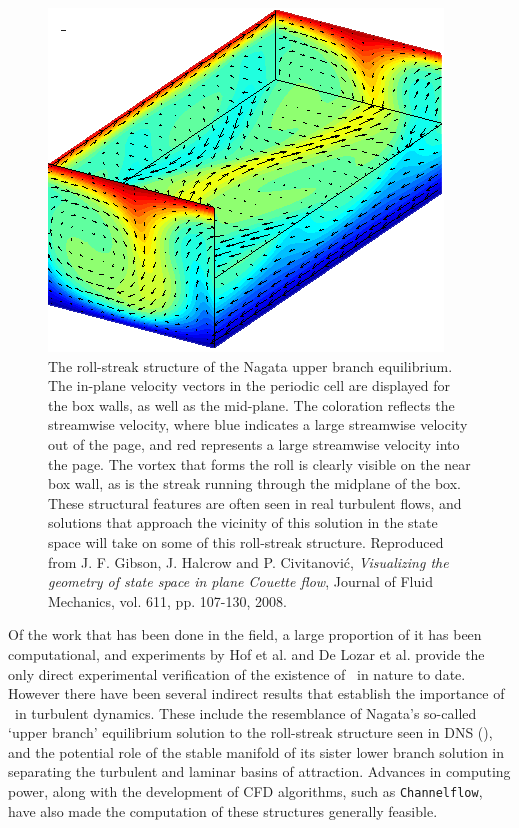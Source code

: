 \begin{figure}[t]
\centerline{\includegraphics[scale=0.5]{Figs/rollStreak}}
\caption[The roll-streak structure of the Nagata upper branch equilibrium]{The roll-streak structure of the Nagata upper branch equilibrium. The in-plane velocity vectors in the periodic cell are displayed for the box walls, as well as the mid-plane. The coloration reflects the streamwise velocity, where blue indicates a large streamwise velocity out of the page, and red represents a large streamwise velocity into the page. The vortex that forms the roll is clearly visible on the near box wall, as is the streak running through the midplane of the box. These structural features are often seen in real turbulent flows, and solutions that approach the vicinity of this solution in the state space will take on some of this roll-streak structure. Reproduced from J. F. Gibson, J. Halcrow and P. Civitanovi\'c, \emph{Visualizing the geometry of state space in plane Couette flow}, Journal of Fluid Mechanics, vol. 611, pp. 107-130, 2008.}\label{fig:rollstreak}
\end{figure}


Of the work that has been done in the field, a large proportion of it has been computational, and experiments by Hof et al. and De Lozar et al. provide the only direct experimental verification of the existence of \ecs~in nature to date. However there have been several indirect results that establish the importance of \ecs\  in turbulent dynamics. These include the resemblance of Nagata's so-called `upper branch' equilibrium solution to the roll-streak structure seen in DNS (), and the potential role of the stable manifold of its sister lower branch solution in separating the turbulent and laminar basins of attraction. Advances in computing power, along with the development of CFD algorithms, such as {\tt Channelflow}, have also made the computation of these structures generally feasible.\\

